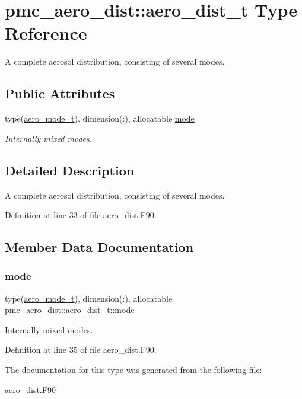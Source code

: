 \hypertarget{structpmc__aero__dist_1_1aero__dist__t}{}\section{pmc\+\_\+aero\+\_\+dist\+:\+:aero\+\_\+dist\+\_\+t Type Reference}
\label{structpmc__aero__dist_1_1aero__dist__t}


A complete aerosol distribution, consisting of several modes.  


\subsection*{Public Attributes}
\begin{DoxyCompactItemize}
\item 
type(\mbox{\hyperlink{structpmc__aero__mode_1_1aero__mode__t}{aero\+\_\+mode\+\_\+t}}), dimension(\+:), allocatable \mbox{\hyperlink{structpmc__aero__dist_1_1aero__dist__t_aff2a0eba25e97bfc8748c92cb1b62a92}{mode}}
\begin{DoxyCompactList}\small\item\em Internally mixed modes. \end{DoxyCompactList}\end{DoxyCompactItemize}


\subsection{Detailed Description}
A complete aerosol distribution, consisting of several modes. 

Definition at line 33 of file aero\+\_\+dist.\+F90.



\subsection{Member Data Documentation}
\mbox{\label{structpmc__aero__dist_1_1aero__dist__t_aff2a0eba25e97bfc8748c92cb1b62a92}} 
\subsubsection{\texorpdfstring{mode}{mode}}
{\footnotesize\ttfamily type(\mbox{\hyperlink{structpmc__aero__mode_1_1aero__mode__t}{aero\+\_\+mode\+\_\+t}}), dimension(\+:), allocatable pmc\+\_\+aero\+\_\+dist\+::aero\+\_\+dist\+\_\+t\+::mode}



Internally mixed modes. 



Definition at line 35 of file aero\+\_\+dist.\+F90.



The documentation for this type was generated from the following file\+:\begin{DoxyCompactItemize}
\item 
\mbox{\hyperlink{aero__dist_8_f90}{aero\+\_\+dist.\+F90}}\end{DoxyCompactItemize}
